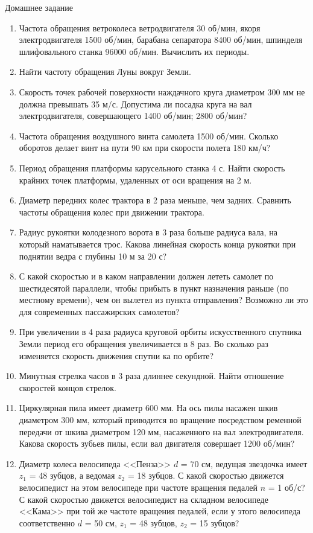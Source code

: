 \documentclass[a6paper, 11pt]{diss_4}
\renewcommand{\'}{\,'}
\begin{document}
\begin{center}
   Домашнее задание
\end{center}
\begin{enumerate}
\item Частота обращения ветроколеса ветродвигателя 30 об/мин, якоря электродвигателя 1500 об/мин, барабана сепаратора 8400 об/мин, шпинделя шлифовального станка 96000 об/мин. Вычислить их периоды.
\item Найти частоту обращения Луны вокруг Земли.
\item Скорость точек рабочей поверхности наждачного  круга диаметром 300 мм не должна превышать 35 м/с. Допустима ли посадка круга на вал электродвигателя, совершающего 1400 об/мин; 2800 об/мин?
\item Частота обращения воздушного винта самолета 1500 об/мин. Сколько оборотов делает винт на пути 90 км при скорости полета 180 км/ч?
\item Период обращения платформы карусельного станка 4 с. Найти скорость крайних точек платформы, удаленных от оси вращения на 2 м.
\item Диаметр передних колес трактора в 2 раза меньше, чем задних. Сравнить частоты обращения колес при  движении трактора.
\item Радиус рукоятки колодезного ворота в 3 раза больше радиуса вала, на который наматывается трос. Какова  линейная скорость конца рукоятки при поднятии ведра с глубины 10 м за 20 с?
\item С какой скоростью и в каком направлении должен  лететь самолет по шестидесятой параллели, чтобы прибыть в пункт назначения раньше (по местному времени), чем он  вылетел из пункта отправления? Возможно ли это для  современных пассажирских самолетов?
\item При увеличении в 4 раза радиуса круговой орбиты искусственного спутника Земли период его обращения увеличивается в 8 раз. Во сколько раз изменяется скорость движения спутни ка по орбите?
\item Минутная стрелка часов в 3 раза длиннее секундной. Найти отношение скоростей концов стрелок.
\item Циркулярная пила имеет диаметр 600 мм. На ось пилы насажен шкив диаметром 300 мм, который  приводится во вращение посредством ременной передачи от шкива диаметром 120 мм, насаженного на вал электродвигателя.  Какова скорость зубьев пилы, если вал двигателя совершает 1200 об/мин?
\item Диаметр колеса велосипеда <<Пенза>> $d$ = 70 см,  ведущая звездочка имеет $z_1$ = 48 зубцов, а ведомая $z_2$ = 18 зубцов. С какой скоростью движется велосипедист на этом велосипеде при частоте вращения педалей $n$ = 1 об/с? С какой скоростью движется велосипедист на складном велосипеде <<Кама>> при той же частоте вращения педалей, если у этого велосипеда  соответственно $d$ = 50 см, $z_1$ = 48 зубцов, $z_2$ = 15 зубцов?

\end{enumerate}
\end{document}
